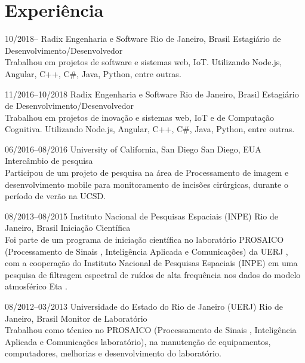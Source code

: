 \documentclass[]{friggeri-cv} %
\begin{document}
\section{Experiência}

\begin{entrylist}



\entry
{10/2018--}
{\hspace{.15cm} Radix Engenharia e Software}
{Rio de Janeiro, Brasil}
{Estagiário de Desenvolvimento/Desenvolvedor \\
Trabalhou em projetos de software e sistemas web, IoT. Utilizando Node.js, Angular, C++, C\#, Java, Python, entre outras.}

\entry
{11/2016--10/2018}
{\hspace{.15cm} Radix Engenharia e Software}
{Rio de Janeiro, Brasil}
{Estagiário de Desenvolvimento/Desenvolvedor \\
Trabalhou em projetos de inovação e sistemas web, IoT e de Computação Cognitiva. Utilizando Node.js, Angular, C++, C\#, Java, Python, entre outras.}

\entry
{06/2016--08/2016}
{\hspace{.15cm} University of California, San Diego}
{San Diego, EUA}
{Intercâmbio de pesquisa \\
Participou de um projeto de pesquisa na área de Processamento de imagem e desenvolvimento mobile para monitoramento de incisões cirúrgicas, durante o período de verão na UCSD.}

\entry
{08/2013--08/2015}
{\hspace{.15cm}Instituto Nacional de Pesquisas Espaciais (INPE)}
{Rio de Janeiro, Brasil}
{Iniciação Científica \\
Foi parte de um programa de iniciação científica no laboratório PROSAICO (Processamento de Sinais , Inteligência Aplicada e Comunicações) da UERJ , com a cooperação do Instituto Nacional de Pesquisas Espaciais (INPE) em uma pesquisa de filtragem espectral de ruídos de alta frequência nos dados do modelo atmosférico Eta .}

\end{entrylist}

\begin{entrylist}
\entry
{08/2012--03/2013}
{\hspace{.15cm}Universidade do Estado do Rio de Janeiro (UERJ)}
{Rio de Janeiro, Brasil}
{Monitor de  Laboratório \\
Trabalhou como técnico no PROSAICO (Processamento de Sinais , Inteligência Aplicada e Comunicações laboratório), na manutenção de equipamentos, computadores, melhorias e desenvolvimento do laboratório.}

\end{entrylist}
\end{document}
